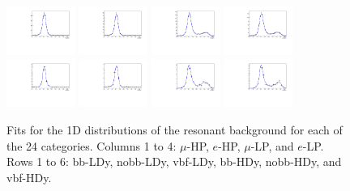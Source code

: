 \begin{figure}[htbp]
  \includegraphics[width=0.2\textwidth]{fig/analysis/LNuJJ_res_MJJ_mu_HP_nobb_HDy.pdf}
  \includegraphics[width=0.2\textwidth]{fig/analysis/LNuJJ_res_MJJ_e_HP_nobb_HDy.pdf}
  \includegraphics[width=0.2\textwidth]{fig/analysis/LNuJJ_res_MJJ_mu_LP_nobb_HDy.pdf}
  \includegraphics[width=0.2\textwidth]{fig/analysis/LNuJJ_res_MJJ_e_LP_nobb_HDy.pdf}\\
  \includegraphics[width=0.2\textwidth]{fig/analysis/LNuJJ_res_MJJ_mu_HP_vbf_HDy.pdf}
  \includegraphics[width=0.2\textwidth]{fig/analysis/LNuJJ_res_MJJ_e_HP_vbf_HDy.pdf}
  \includegraphics[width=0.2\textwidth]{fig/analysis/LNuJJ_res_MJJ_mu_LP_vbf_HDy.pdf}
  \includegraphics[width=0.2\textwidth]{fig/analysis/LNuJJ_res_MJJ_e_LP_vbf_HDy.pdf}\\
  \caption{
    Fits for the 1D \MJ distributions of the resonant background for each of the 24 categories.
    Columns 1 to 4: $\mu$-HP, $e$-HP, $\mu$-LP, and $e$-LP.
    Rows 1 to 6: bb-LDy, nobb-LDy, vbf-LDy, bb-HDy, nobb-HDy, and vbf-HDy.
  }
  \label{fig:fits_res_MJJ_Run2}
\end{figure}

